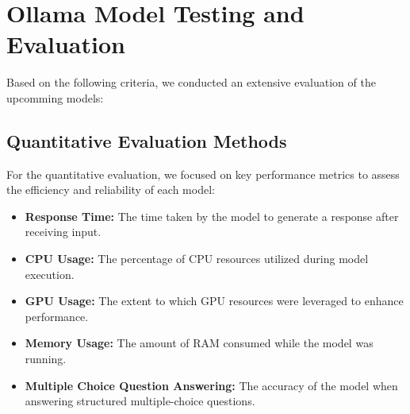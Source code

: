 




\section{Ollama Model Testing and Evaluation}

Based on the following criteria, we conducted an extensive evaluation of the upcomming models:

\subsection{Quantitative Evaluation Methods}

For the quantitative evaluation, we focused on key performance metrics to assess the efficiency and reliability of each model:

\begin{itemize}
    \item \textbf{Response Time:} The time taken by the model to generate a response after receiving input.
    \item \textbf{CPU Usage:} The percentage of CPU resources utilized during model execution.
    \item \textbf{GPU Usage:} The extent to which GPU resources were leveraged to enhance performance.
    \item \textbf{Memory Usage:} The amount of RAM consumed while the model was running.
    \item \textbf{Multiple Choice Question Answering:} The accuracy of the model when answering structured multiple-choice questions.
\end{itemize}

